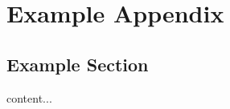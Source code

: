 \chapter{Example Appendix}

\section{Example Section}

\begin{flushleft}
	content...
\end{flushleft}